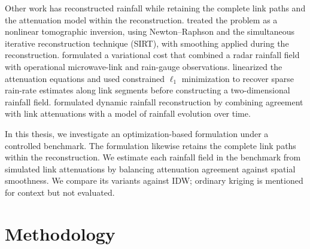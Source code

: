 \documentclass[11pt]{article}
\newcommand{\cleartorecto}{%
  \clearpage
  \ifodd\value{page}
  \else
    \thispagestyle{empty}
    \null
    \clearpage
  \fi
}
\begin{document}
Other work has reconstructed rainfall while retaining the complete link paths and the attenuation model within the reconstruction. \citet{zinevich2008rainfall} treated the problem as a nonlinear tomographic inversion, using Newton--Raphson and the simultaneous iterative reconstruction technique (SIRT), with smoothing applied during the reconstruction. \citet{bianchi2013variational} formulated a variational cost that combined a radar rainfall field with operational microwave-link and rain-gauge observations. \citet{liberman2014sparse} linearized the attenuation equations and used constrained $\ell_1$ minimization to recover sparse rain-rate estimates along link segments before constructing a two-dimensional rainfall field. \citet{roy2016dynamic} formulated dynamic rainfall reconstruction by combining agreement with link attenuations with a model of rainfall evolution over time.

In this thesis, we investigate an optimization-based formulation under a controlled benchmark. The formulation likewise retains the complete link paths within the reconstruction. We estimate each rainfall field in the benchmark from simulated link attenuations by balancing attenuation agreement against spatial smoothness. We compare its variants against IDW; ordinary kriging is mentioned for context but not evaluated.



\cleartorecto
\section{Methodology}
\end{document}
